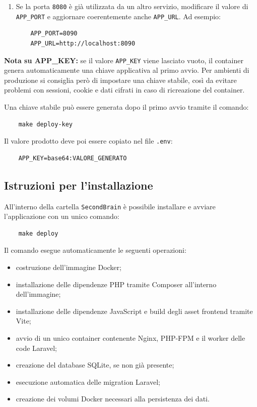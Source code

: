 \documentclass[a4paper,10pt]{article}
\begin{document}
\begin{enumerate}
  \begin{lstlisting}
    LLM_BASE_URL=https://esempio-llm.zucchetti.it
    LLM_API_KEY=chiave_api_personale
    LLM_MODEL=gemma3:4b
  \end{lstlisting}

  \item Se la porta \texttt{8080} è già utilizzata da un altro servizio, modificare il valore di \texttt{APP\_PORT} e aggiornare coerentemente anche \texttt{APP\_URL}. Ad esempio:

  \begin{lstlisting}
    APP_PORT=8090
    APP_URL=http://localhost:8090
  \end{lstlisting}

\end{enumerate}

\textbf{Nota su APP\_KEY:} se il valore \texttt{APP\_KEY} viene lasciato vuoto, il container genera automaticamente una chiave applicativa al primo avvio. Per ambienti di produzione si consiglia però di impostare una chiave stabile, così da evitare problemi con sessioni, cookie e dati cifrati in caso di ricreazione del container.

Una chiave stabile può essere generata dopo il primo avvio tramite il comando:

\begin{lstlisting}
    make deploy-key
\end{lstlisting}

Il valore prodotto deve poi essere copiato nel file \texttt{.env}:

\begin{lstlisting}
    APP_KEY=base64:VALORE_GENERATO
\end{lstlisting}

\subsection{Istruzioni per l'installazione}
All'interno della cartella \texttt{SecondBrain} è possibile installare e avviare l'applicazione con un unico comando:

\begin{lstlisting}
    make deploy
\end{lstlisting}

Il comando esegue automaticamente le seguenti operazioni:
\begin{itemize}
    \item costruzione dell'immagine Docker;
    \item installazione delle dipendenze PHP tramite Composer all'interno dell'immagine;
    \item installazione delle dipendenze JavaScript e build degli asset frontend tramite Vite;
    \item avvio di un unico container contenente Nginx, PHP-FPM e il worker delle code Laravel;
    \item creazione del database SQLite, se non già presente;
    \item esecuzione automatica delle migration Laravel;
    \item creazione dei volumi Docker necessari alla persistenza dei dati.
\end{itemize}
\end{document}
